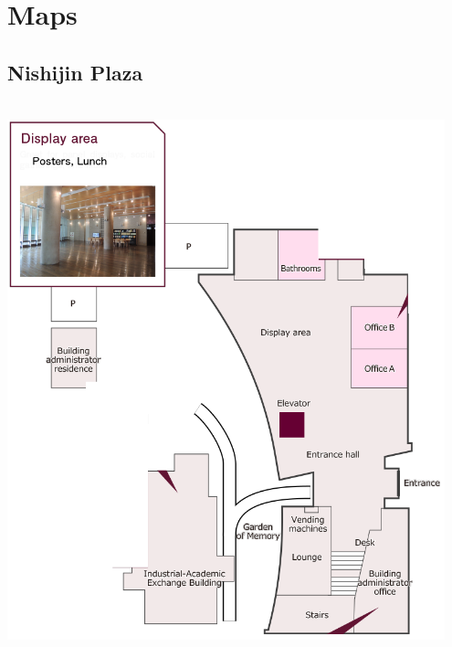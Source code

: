 \renewcommand*{\thepage}{B\arabic{page}}
 
\section{Maps}
\subsection*{Nishijin Plaza}
\\
\noindent\includegraphics[width=0.95\textwidth]{1F.png}
\newpage
{}\\
